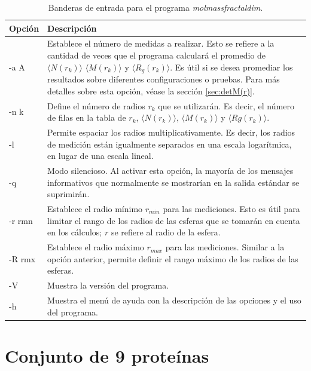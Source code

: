 	\begin{table}[H]
		\centering
		\begin{tabular}{lp{11cm}}
			\hline
			\textbf{Opci\'{o}n} & \textbf{Descripci\'{o}n} \\ \hline
			-a A & Establece el n\'{u}mero de medidas a realizar. Esto se refiere a la cantidad de veces que el programa calcular\'{a} el promedio de $\langle N(r_k) \rangle$ $\langle M(r_k) \rangle$ y $\langle R_g(r_k) \rangle$. Es \'{u}til si se desea promediar los resultados sobre diferentes configuraciones o pruebas. Para más detalles sobre esta opción, véase la sección \ref{sec:detM(r)}. 
			\\ 
			-n k & Define el n\'{u}mero de radios $r_{k}$ que se utilizar\'{a}n. Es decir, el n\'{u}mero de filas en la tabla de $r_{k}$, $\langle N(r_k) \rangle$, $\langle M(r_k) \rangle$ y $\langle Rg(r_k) \rangle$.
			\\
			-l & Permite espaciar los radios multiplicativamente. Es decir, los radios de medición están igualmente separados en una escala logarítmica, en lugar de una escala lineal.
			\\
			-q & Modo silencioso. Al activar esta opci\'{o}n, la mayor\'{i}a de los mensajes informativos que normalmente se mostrar\'{i}an en la salida est\'{a}ndar se suprimir\'{a}n. 
			\\ 
			-r rmn & Establece el radio m\'{i}nimo $r_{min}$ para las mediciones. Esto es \'{u}til para limitar el rango de los radios de las esferas que se tomar\'{a}n en cuenta en los c\'{a}lculos; $r$ se refiere al radio de la esfera. \\ 
			-R rmx & Establece el radio m\'{a}ximo $r_{max}$ para las mediciones. Similar a la opci\'{o}n anterior, permite definir el rango m\'{a}ximo de los radios de las esferas. 
			\\ 
			-V & Muestra la versi\'{o}n del programa. 
			\\ 
			-h & Muestra el men\'{u} de ayuda con la descripci\'{o}n de las opciones y el uso del programa. 
			\\ \hline
		\end{tabular}
		\caption{Banderas de entrada para el programa \emph{molmassfractaldim}.}
		\label{tab:opciones_programa}
	\end{table}

\chapter{Conjunto de 9 proteínas}
\label{9P}

